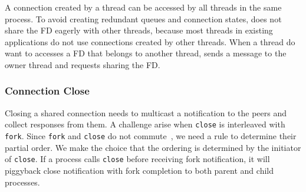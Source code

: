 A connection created by a thread can be accessed by all threads in the same process.
To avoid creating redundant queues and connection states, \libipc does not share the FD eagerly with other threads, because most threads in existing applications do not use connections created by other threads.
When a thread do want to accesses a FD that belongs to another thread, \libipc sends a message to the owner thread and requests sharing the FD. %

\subsubsection{Connection Close}
\label{subsubsec:fork_close}



Closing a shared connection needs to multicast a notification to the peers and collect responses from them. A challenge arise when \texttt{close} is interleaved with \texttt{fork}. Since \texttt{fork} and \texttt{close} do not commute~\cite{clements2015scalable}, we need a rule to determine their partial order. We make the choice that the ordering is determined by the initiator of \texttt{close}. If a process calls \texttt{close} before receiving fork notification, it will piggyback close notification with fork completion to both parent and child processes.

